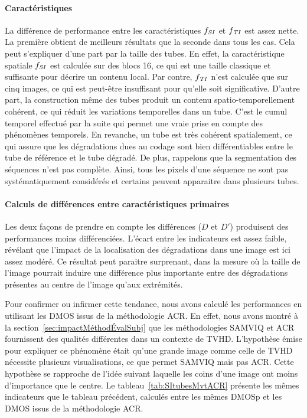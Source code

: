 \paragraph{Caractéristiques}
La différence de performance entre les caractéristiques $f_{\mathit{SI}}$ et $f_{\mathit{TI}}$ est assez nette. La première obtient de meilleurs résultats que la seconde dans tous les cas. Cela peut s'expliquer d'une part par la taille des tubes. En effet, la caractéristique spatiale $f_{\mathit{SI}}$ est calculée sur des blocs 16, ce qui est une taille classique et suffisante pour décrire un contenu local. Par contre, $f_{\mathit{TI}}$ n'est calculée que sur cinq images, ce qui est peut-être insuffisant pour qu'elle soit significative. D'autre part, la construction même des tubes produit un contenu spatio-temporellement cohérent, ce qui réduit les variations temporelles dans un tube. C'est le cumul temporel effectué par la suite qui permet une vraie prise en compte des phénomènes temporels. En revanche, un tube est très cohérent spatialement, ce qui assure que les dégradations dues au codage sont bien différentiables entre le tube de référence et le tube dégradé. De plus, rappelons que la segmentation des séquences n'est pas complète. Ainsi, tous les pixels d'une séquence ne sont pas systématiquement considérés et certains peuvent apparaitre dans plusieurs tubes.


\paragraph{Calculs de différences entre caractéristiques primaires}
Les deux façons de prendre en compte les différences ($D$ et $D'$) produisent des performances moins différenciées. L'écart entre les indicateurs est assez faible, révélant que l'impact de la localisation des dégradations dans une image est ici assez modéré. Ce résultat peut paraitre surprenant, dans la mesure où la taille de l'image pourrait induire une différence plus importante entre des dégradations présentes au centre de l'image qu'aux extrémités.

Pour confirmer ou infirmer cette tendance, nous avons calculé les performances en utilisant les DMOS issus de la méthodologie ACR. En effet, nous avons montré à la section~\ref{sec:impactMéthodÉvalSubj} que les méthodologies SAMVIQ et ACR fournissent des qualités différentes dans un contexte de TVHD. L'hypothèse émise pour expliquer ce phénomène était qu'une grande image comme celle de TVHD nécessite plusieurs visualisations, ce que permet SAMVIQ mais pas ACR. Cette hypothèse se rapproche de l'idée suivant laquelle les coins d'une image ont moins d'importance que le centre. Le tableau~\ref{tab:SItubesMvtACR} présente les mêmes indicateurs que le tableau précédent, calculés entre les mêmes DMOSp et les DMOS issus de la méthodologie ACR.

